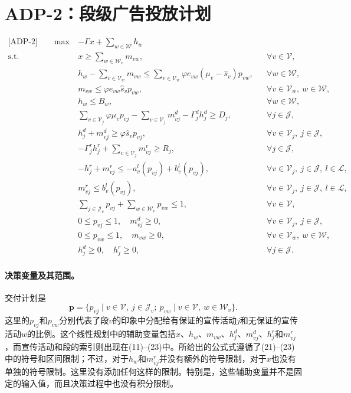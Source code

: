 \documentclass{article}
\begin{document}
\section*{ADP-2：段级广告投放计划}
\begin{align}
\text{[ADP-2]}\qquad \max\quad &-\Gamma x+\sum_{w\in\mathcal W}h_w \tag{10}\\
\text{s.t.}\qquad &x\geq\sum_{w\in\mathcal W_v}m_{vw}, &&\forall v\in\mathcal V, \tag{11}\\
&h_w-\sum_{v\in\mathcal V_w}m_{vw}\leq\sum_{v\in\mathcal V_w}\varphi e_{vw}(\mu_v-\hat s_v)p_{vw}, &&\forall w\in\mathcal W, \tag{12}\\
&m_{vw}\leq\varphi e_{vw}\hat s_vp_{vw}, &&\forall v\in\mathcal V_w,\ w\in\mathcal W, \tag{13}\\
&h_w\leq B_w, &&\forall w\in\mathcal W, \tag{14}\\
&\sum_{v\in\mathcal V_j}\varphi\mu_vp_{vj}-\sum_{v\in\mathcal V_j}m^d_{vj}-\Gamma^d_jh^d_j\geq D_j, &&\forall j\in\mathcal J, \tag{15}\\
&h^d_j+m^d_{vj}\geq\varphi\hat s_vp_{vj}, &&\forall v\in\mathcal V_j,\ j\in\mathcal J, \tag{16}\\
&-\Gamma^r_jh^r_j+\sum_{v\in\mathcal V_j}m^r_{vj}\geq R_j, &&\forall j\in\mathcal J, \tag{17}\\
&-h^r_j+m^r_{vj}\leq-a^l_v(p_{vj})+b^l_v(p_{vj}), &&\forall v\in\mathcal V_j,\ j\in\mathcal J,\ l\in\mathcal L, \tag{18}\\
&m^r_{vj}\leq b^l_v(p_{vj}), &&\forall v\in\mathcal V_j,\ j\in\mathcal J,\ l\in\mathcal L, \tag{19}\\
&\sum_{j\in\mathcal J_v}p_{vj}+\sum_{w\in\mathcal W_v}p_{vw}\leq1, &&\forall v\in\mathcal V, \tag{20}\\
&0\leq p_{vj}\leq1,\quad m^d_{vj}\geq0, &&\forall v\in\mathcal V_j,\ j\in\mathcal J, \tag{21}\\
&0\leq p_{vw}\leq1,\quad m_{vw}\geq0, &&\forall v\in\mathcal V_w,\ w\in\mathcal W, \tag{22}\\
&h^d_j\geq0,\quad h^r_j\geq0, &&\forall j\in\mathcal J. \tag{23}
\end{align}

\paragraph{决策变量及其范围。}
交付计划是
\[
\boldsymbol p=\{p_{vj}\mid v\in\mathcal V,\ j\in\mathcal J_v;\ p_{vw}\mid v\in\mathcal V,\ w\in\mathcal W_v\}.
\]
这里的$p_{vj}$和$p_{vw}$分别代表了段$v$的印象中分配给有保证的宣传活动$j$和无保证的宣传活动$w$的比例。这个线性规划中的辅助变量包括$x$、$h_w$、$m_{vw}$、$h^d_j$、$m^d_{vj}$、$h^r_j$和$m^r_{vj}$，而宣传活动和段的索引则出现在(11)--(23)中。所给出的公式式遵循了(21)--(23)中的符号和区间限制；不过，对于$h_w$和$m^r_{vj}$并没有额外的符号限制，对于$x$也没有单独的符号限制。这里没有添加任何这样的限制。特别是，这些辅助变量并不是固定的输入值，而且决策过程中也没有积分限制。
\end{document}
